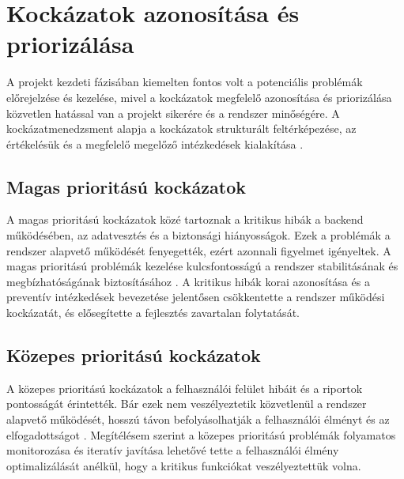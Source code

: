 \section{Kockázatok azonosítása és priorizálása}

A projekt kezdeti fázisában kiemelten fontos volt a potenciális problémák előrejelzése és kezelése, 
mivel a kockázatok megfelelő azonosítása és priorizálása közvetlen hatással van a projekt sikerére 
és a rendszer minőségére. A kockázatmenedzsment alapja a kockázatok strukturált feltérképezése, 
az értékelésük és a megfelelő megelőző intézkedések kialakítása \cite{Hajdu2014,Szalay2018,Kovacs2016}.

\subsection{Magas prioritású kockázatok}

A magas prioritású kockázatok közé tartoznak a kritikus hibák a backend működésében, az adatvesztés és a biztonsági hiányosságok.  
Ezek a problémák a rendszer alapvető működését fenyegették, ezért azonnali figyelmet igényeltek.  
A magas prioritású problémák kezelése kulcsfontosságú a rendszer stabilitásának és megbízhatóságának biztosításához \cite{Kaposi2019,Szalay2018}.  
A kritikus hibák korai azonosítása és a preventív intézkedések bevezetése jelentősen csökkentette 
a rendszer működési kockázatát, és elősegítette a fejlesztés zavartalan folytatását.

\subsection{Közepes prioritású kockázatok}

A közepes prioritású kockázatok a felhasználói felület hibáit és a riportok pontosságát érintették.  
Bár ezek nem veszélyeztetik közvetlenül a rendszer alapvető működését, hosszú távon befolyásolhatják 
a felhasználói élményt és az elfogadottságot \cite{Hajdu2014,Kovacs2016}.  
Megítélésem szerint a közepes prioritású problémák folyamatos monitorozása és iteratív javítása lehetővé 
tette a felhasználói élmény optimalizálását anélkül, hogy a kritikus funkciókat veszélyeztettük volna.

